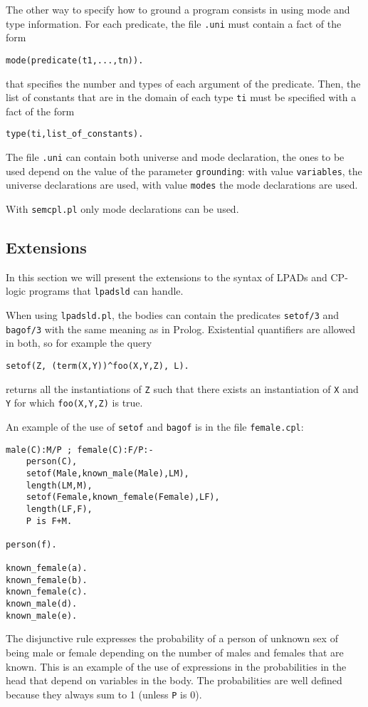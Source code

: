 \documentclass[a4paper,10pt]{article}
\begin{document}
The other way to specify how to ground a program consists in using mode and type information. For each predicate, the file \texttt{.uni} must contain a fact of the form
\begin{verbatim}
mode(predicate(t1,...,tn)).
\end{verbatim}
that specifies the number and types of each argument of the predicate. Then, the list of constants that
are in the domain of each type \texttt{ti} must be specified with a fact of the form
\begin{verbatim}
type(ti,list_of_constants).
\end{verbatim}
The file \texttt{.uni} can contain both universe and mode declaration, the ones to be used depend on the value of the parameter \texttt{grounding}: with value \texttt{variables}, the universe declarations are used, with value \texttt{modes} the mode declarations are used.

With \texttt{semcpl.pl} only mode declarations can be used.


\subsection{Extensions}
In this section we will present the extensions to the syntax of LPADs and CP-logic programs that \texttt{lpadsld} can handle.

When using \texttt{lpadsld.pl}, the bodies can contain the predicates \texttt{setof/3} and \texttt{bagof/3} with the same meaning as in Prolog. Existential quantifiers are allowed in both, so for example the query
\begin{verbatim}
setof(Z, (term(X,Y))^foo(X,Y,Z), L).
\end{verbatim}
returns all the instantiations of \texttt{Z} such that there exists an instantiation of \texttt{X} and \texttt{Y} for which \texttt{foo(X,Y,Z)} is true.

An example of the use of \texttt{setof} and \texttt{bagof} is in the file \texttt{female.cpl}:
\begin{verbatim}
male(C):M/P ; female(C):F/P:-
    person(C),
    setof(Male,known_male(Male),LM),
    length(LM,M),
    setof(Female,known_female(Female),LF),
    length(LF,F),
    P is F+M.

person(f).

known_female(a).
known_female(b).
known_female(c).
known_male(d).
known_male(e).
\end{verbatim}
The disjunctive rule expresses the probability of a person of unknown sex of being male or female depending on the number of males and females that are known.
This is an example of the use of expressions in the probabilities in the head that depend on variables in the body. The probabilities are well defined because they always sum to 1 (unless \texttt{P} is 0).
\end{document}

